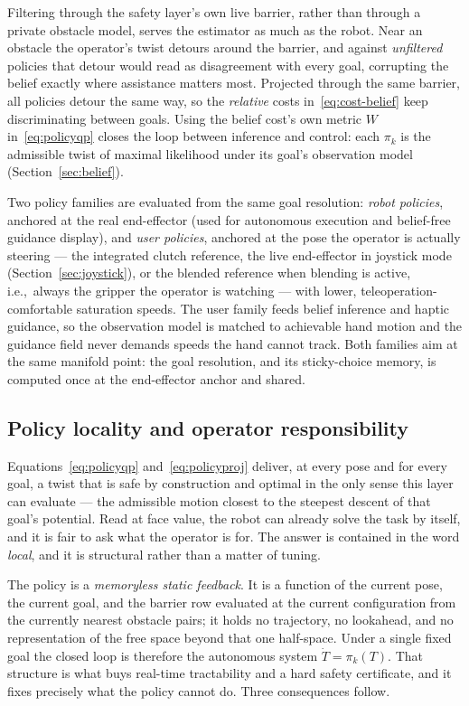 \documentclass[12pt,a4paper,twoside,openright]{report}
\begin{document}
Filtering through the safety layer's own live barrier, rather than through a private obstacle model, serves the estimator as much as the robot. Near an obstacle the operator's twist detours around the barrier, and against \emph{unfiltered} policies that detour would read as disagreement with every goal, corrupting the belief exactly where assistance matters most. Projected through the same barrier, all policies detour the same way, so the \emph{relative} costs in~\eqref{eq:cost-belief} keep discriminating between goals. Using the belief cost's own metric $W$ in~\eqref{eq:policyqp} closes the loop between inference and control: each $\pi_k$ is the admissible twist of maximal likelihood under its goal's observation model (Section~\ref{sec:belief}).

Two policy families are evaluated from the same goal resolution: \emph{robot policies}, anchored at the real end-effector (used for autonomous execution and belief-free guidance display), and \emph{user policies}, anchored at the pose the operator is actually steering --- the integrated clutch reference, the live end-effector in joystick mode (Section~\ref{sec:joystick}), or the blended reference when blending is active, i.e.,\ always the gripper the operator is watching --- with lower, teleoperation-comfortable saturation speeds. The user family feeds belief inference and haptic guidance, so the observation model is matched to achievable hand motion and the guidance field never demands speeds the hand cannot track. Both families aim at the same manifold point: the goal resolution, and its sticky-choice memory, is computed once at the end-effector anchor and shared.

\subsection{Policy locality and operator responsibility}
\label{sec:locality}

Equations~\eqref{eq:policyqp} and~\eqref{eq:policyproj} deliver, at every pose and for every goal, a twist that is safe by construction and optimal in the only sense this layer can evaluate --- the admissible motion closest to the steepest descent of that goal's potential. Read at face value, the robot can already solve the task by itself, and it is fair to ask what the operator is for. The answer is contained in the word \emph{local}, and it is structural rather than a matter of tuning.

The policy is a \emph{memoryless static feedback}. It is a function of the current pose, the current goal, and the barrier row evaluated at the current configuration from the currently nearest obstacle pairs; it holds no trajectory, no lookahead, and no representation of the free space beyond that one half-space. Under a single fixed goal the closed loop is therefore the autonomous system $\dot{T} = \pi_k(T)$. That structure is what buys real-time tractability and a hard safety certificate, and it fixes precisely what the policy cannot do. Three consequences follow.
\end{document}
